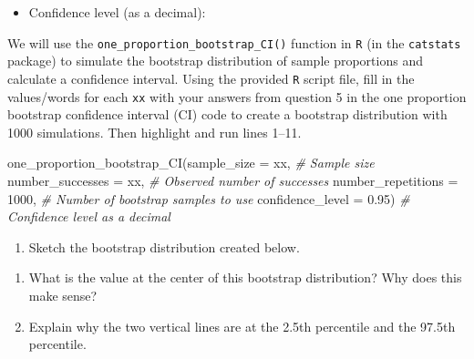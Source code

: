 \documentclass[
]{report}
\newenvironment{Shaded}{\begin{snugshade}}{\end{snugshade}}
\newcommand{\AttributeTok}[1]{\textcolor[rgb]{0.77,0.63,0.00}{#1}}
\newcommand{\CommentTok}[1]{\textcolor[rgb]{0.56,0.35,0.01}{\textit{#1}}}
\newcommand{\DecValTok}[1]{\textcolor[rgb]{0.00,0.00,0.81}{#1}}
\newcommand{\FloatTok}[1]{\textcolor[rgb]{0.00,0.00,0.81}{#1}}
\newcommand{\FunctionTok}[1]{\textcolor[rgb]{0.00,0.00,0.00}{#1}}
\newcommand{\NormalTok}[1]{#1}
\providecommand{\tightlist}{%
  \setlength{\itemsep}{0pt}\setlength{\parskip}{0pt}}
\begin{document}
\vspace{.1in}

\begin{itemize}
\tightlist
\item
  Confidence level (as a decimal):
\end{itemize}

\vspace{.1in}

We will use the \texttt{one\_proportion\_bootstrap\_CI()} function in \texttt{R} (in the \texttt{catstats} package) to simulate the bootstrap distribution of sample proportions and calculate a confidence interval. Using the provided \texttt{R} script file, fill in the values/words for each \texttt{xx} with your answers from question 5 in the one proportion bootstrap confidence interval (CI) code to create a bootstrap distribution with 1000 simulations. Then highlight and run lines 1--11.

\begin{Shaded}
\begin{Highlighting}[]
\FunctionTok{one\_proportion\_bootstrap\_CI}\NormalTok{(}\AttributeTok{sample\_size =}\NormalTok{ xx, }\CommentTok{\# Sample size}
                    \AttributeTok{number\_successes =}\NormalTok{ xx, }\CommentTok{\# Observed number of successes}
                    \AttributeTok{number\_repetitions =} \DecValTok{1000}\NormalTok{, }\CommentTok{\# Number of bootstrap samples to use}
                    \AttributeTok{confidence\_level =} \FloatTok{0.95}\NormalTok{) }\CommentTok{\# Confidence level as a decimal}
\end{Highlighting}
\end{Shaded}

\begin{enumerate}
\def\labelenumi{\arabic{enumi}.}
\setcounter{enumi}{5}
\tightlist
\item
  Sketch the bootstrap distribution created below.
\end{enumerate}

\vspace{1.8in}

\begin{enumerate}
\def\labelenumi{\arabic{enumi}.}
\setcounter{enumi}{6}
\item
  What is the value at the center of this bootstrap distribution? Why does this make sense?
  \vspace{.8in}
\item
  Explain why the two vertical lines are at the 2.5th percentile and the 97.5th percentile.
\end{enumerate}
\end{document}
